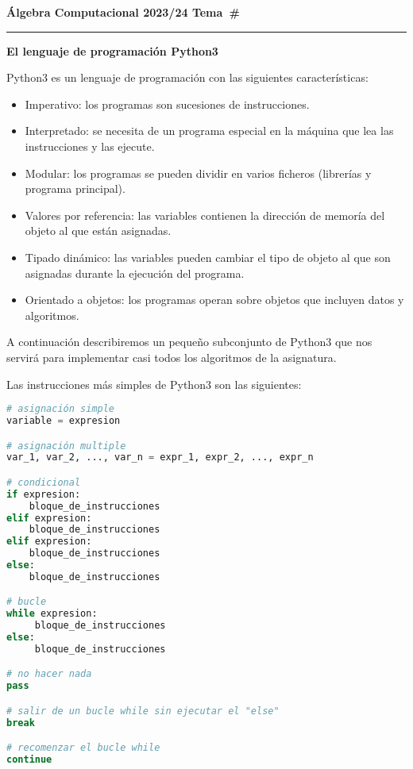 \documentclass[a4paper, 11pt]{article}
\newcounter{numerodetema}
\newcommand\tema[1]{{\eject\stepcounter{numerodetema}\bf Álgebra Computacional
2023/24 \hfill Tema~\#\arabic{numerodetema}}\par\smallskip\hrule\bigskip\par
\begin{center}{\Large\bf #1}\end{center}}
\theoremstyle{plain}
\theoremstyle{definition}
\begin{document}
\tema{El lenguaje de programación Python3}

Python3 es un lenguaje de programación con las siguientes características:
\begin{itemize}
\item Imperativo: los programas son sucesiones de instrucciones.
\item Interpretado: se necesita de un programa especial en la máquina que lea
las instrucciones y las ejecute.
\item Modular: los programas se pueden dividir en varios ficheros (librerías y
programa principal).
\item Valores por referencia: las variables contienen la dirección de memoría
del objeto al que están asignadas.
\item Tipado dinámico: las variables pueden cambiar el tipo de objeto al que
son asignadas durante la ejecución del programa.
\item Orientado a objetos: los programas operan sobre objetos que incluyen
datos y algoritmos.
\end{itemize}

\bigskip

A continuación describiremos un pequeño subconjunto de Python3 que nos servirá
para implementar casi todos los algoritmos de la asignatura.

\bigskip

Las instrucciones más simples de Python3 son las siguientes:

\bigskip

\begin{lstlisting}[language=Python,morekeywords={as,assert,nonlocal,with,yield}]
# asignación simple
variable = expresion

# asignación multiple
var_1, var_2, ..., var_n = expr_1, expr_2, ..., expr_n 

# condicional
if expresion:
    bloque_de_instrucciones
elif expresion:
    bloque_de_instrucciones
elif expresion:
    bloque_de_instrucciones
else:
    bloque_de_instrucciones

# bucle
while expresion:
     bloque_de_instrucciones
else:
     bloque_de_instrucciones

# no hacer nada
pass

# salir de un bucle while sin ejecutar el "else"
break

# recomenzar el bucle while
continue
\end{lstlisting}

\bigskip
\end{document}
